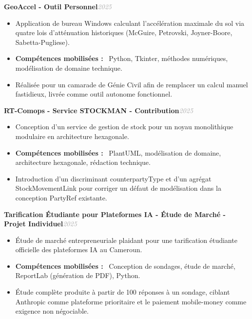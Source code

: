 \documentclass[10pt, a4paper]{article}
\newcommand{\entryhead}[2]{%
  \noindent\textbf{#1}\hfill{\small\textit{\textcolor{darkgray}{#2}}}\\[-4pt]%
}
\newcommand{\blabel}[1]{\textbf{#1}\ }
\begin{document}
\vspace{4pt}
\entryhead{GeoAccel \normalfont\small- Outil Personnel}{2025}
\begin{itemize}
  \item Application de bureau Windows calculant l'accélération maximale du sol via quatre lois
        d'atténuation historiques (McGuire, Petrovski, Joyner-Boore, Sabetta-Pugliese).
  \item \blabel{Compétences mobilisées :} Python, Tkinter, méthodes numériques, modélisation de
        domaine technique.
  \item Réalisée pour un camarade de Génie Civil afin de remplacer un calcul manuel fastidieux,
        livrée comme outil autonome fonctionnel.
\end{itemize}

\vspace{4pt}
\entryhead{RT-Comops - Service STOCKMAN \normalfont\small- Contribution}{2025}
\begin{itemize}
  \item Conception d'un service de gestion de stock pour un noyau monolithique modulaire en
        architecture hexagonale.
  \item \blabel{Compétences mobilisées :} PlantUML, modélisation de domaine, architecture
        hexagonale, rédaction technique.
  \item Introduction d'un discriminant counterpartyType et d'un agrégat StockMovementLink pour
        corriger un défaut de modélisation dans la conception PartyRef existante.
\end{itemize}

\vspace{4pt}
\entryhead{Tarification Étudiante pour Plateformes IA - Étude de Marché \normalfont\small- Projet Individuel}{2025}
\begin{itemize}
  \item Étude de marché entrepreneuriale plaidant pour une tarification étudiante officielle
        des plateformes IA au Cameroun.
  \item \blabel{Compétences mobilisées :} Conception de sondages, étude de marché, ReportLab
        (génération de PDF), Python.
  \item Étude complète produite à partir de 100 réponses à un sondage, ciblant Anthropic comme
        plateforme prioritaire et le paiement mobile-money comme exigence non négociable.
\end{itemize}

\end{document}
